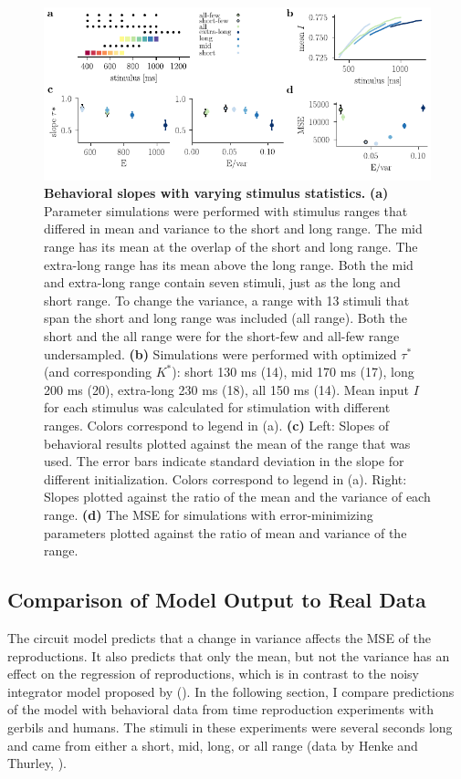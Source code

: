 \documentclass[10pt, a4paper]{article}
\begin{document}
\begin{figure}[ht]
	\centering
	\includegraphics{figures/ranges_new2.pdf}
	\caption{\textbf{Behavioral slopes with varying stimulus statistics.} 
	\textbf{(a)} Parameter simulations were performed with stimulus ranges that differed in mean and variance to the short and long range. The mid range has its mean at the overlap of the short and long range. The extra-long range has its mean above the long range. Both the mid and extra-long range contain seven stimuli, just as the long and short range. To change the variance, a range with 13 stimuli that span the short and long range was included (all range). Both the short and the all range were for the short-few and all-few range undersampled.
	\textbf{(b)} Simulations were performed with optimized $\tau^*$ (and corresponding  $K^*$): short 130 ms (14), mid 170 ms (17), long 200 ms (20), extra-long 230 ms (18), all 150 ms (14). Mean input $I$ for each stimulus was calculated for stimulation with different ranges. Colors correspond to legend in (a). 
	\textbf{(c)} Left: Slopes of behavioral results plotted against the mean of the range that was used. The error bars indicate standard deviation in the slope for different initialization. Colors correspond to legend in (a).
	Right: Slopes plotted against the ratio of the mean and the variance of each range. 
	\textbf{(d)} The MSE for simulations with error-minimizing parameters plotted against the ratio of mean and variance of the range.
	}
\label{fig:new_ranges}
\end{figure}

\subsection{Comparison of Model Output to Real Data}
The circuit model predicts that a change in variance affects the MSE of the reproductions.
It also predicts that only the mean, but not the variance has an effect on the regression of reproductions, which is in contrast to the noisy integrator model proposed by \citeauthor{Thurley2016} (\citeyear{Thurley2016}).
In the following section, I compare predictions of the model with behavioral data from time reproduction experiments with gerbils and humans. The stimuli in these experiments were several seconds long and came from either a short, mid, long, or all range (data by Henke and Thurley, \cite{Henke2022}).
\end{document}
